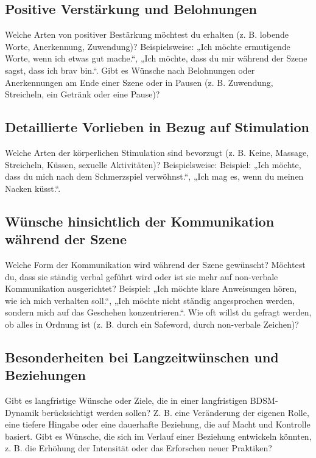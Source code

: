 \documentclass[a4paper,12pt]{article}
\begin{document}
\newpage

\subsection{Positive Verstärkung und Belohnungen}
\noindent Welche Arten von positiver Bestärkung möchtest du erhalten (z. B. lobende Worte, Anerkennung, Zuwendung)? Beispielsweise: „Ich möchte ermutigende Worte, wenn ich etwas gut mache.“, „Ich möchte, dass du mir während der Szene sagst, dass ich brav bin.“. Gibt es Wünsche nach Belohnungen oder Anerkennungen am Ende einer Szene oder in Pausen (z. B. Zuwendung, Streicheln, ein Getränk oder eine Pause)?\newline
\noindent \TextField[name=WuenscheVerst,multiline=true,height=20em, width=37em]{}

\subsection{Detaillierte Vorlieben in Bezug auf Stimulation}
\noindent Welche Arten der körperlichen Stimulation sind bevorzugt (z. B. Keine, Massage, Streicheln, Küssen, sexuelle Aktivitäten)? Beispielsweise: Beispiel: „Ich möchte, dass du mich nach dem Schmerzspiel verwöhnst.“, „Ich mag es, wenn du meinen Nacken küsst.“.\newline
\noindent \TextField[name=WuenscheStimu,multiline=true,height=20em, width=37em]{}

\newpage

\subsection{Wünsche hinsichtlich der Kommunikation während der Szene}
\noindent Welche Form der Kommunikation wird während der Szene gewünscht? Möchtest du, dass sie ständig verbal geführt wird oder ist sie mehr auf non-verbale Kommunikation ausgerichtet? Beispiel: „Ich möchte klare Anweisungen hören, wie ich mich verhalten soll.“, „Ich möchte nicht ständig angesprochen werden, sondern mich auf das Geschehen konzentrieren.“. Wie oft willst du gefragt werden, ob alles in Ordnung ist (z. B. durch ein Safeword, durch non-verbale Zeichen)? \newline
\noindent \TextField[name=WuenscheKomm,multiline=true,height=20em, width=37em]{}

\subsection{Besonderheiten bei Langzeitwünschen und Beziehungen}
\noindent Gibt es langfristige Wünsche oder Ziele, die in einer langfristigen BDSM-Dynamik berücksichtigt werden sollen? Z. B. eine Veränderung der eigenen Rolle, eine tiefere Hingabe oder eine dauerhafte Beziehung, die auf Macht und Kontrolle basiert. Gibt es Wünsche, die sich im Verlauf einer Beziehung entwickeln könnten, z. B. die Erhöhung der Intensität oder das Erforschen neuer Praktiken? \newline
\noindent \TextField[name=WuenscheLangzeit,multiline=true,height=15em, width=37em]{}
\end{document}

